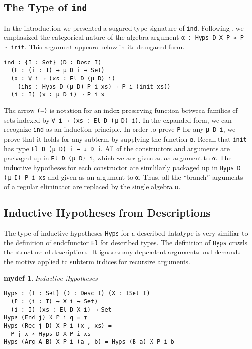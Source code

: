 \documentclass[preprint,nonatbib]{sigplanconf}
\newtheorem{mydef}{mydef}
\begin{document}
\subsection{The Type of {\tt ind}}

In the introduction we presented a sugared type signature of
{\tt ind}. Following \citet{dagand:phd}, we emphasized
the categorical nature of the algebra argument
{\tt α : Hyps D X P ⇒ P ∘ init}. 
This argument appears below in its desugared form.

\begin{verbatim}
ind : {I : Set} (D : Desc I)
  (P : (i : I) → μ D i → Set)
  (α : ∀ i → (xs : El D (μ D) i)
    (ihs : Hyps D (μ D) P i xs) → P i (init xs))
  (i : I) (x : μ D i) → P i x
\end{verbatim}

The arrow {\tt (⇒)} is notation for an index-preserving function
between families of sets indexed by
{\tt ∀ i → (xs : El D (μ D) i)}.
In the expanded form, we can recognize {\tt ind} as an induction
principle. In order to prove {\tt P} for any {\tt μ D i},
we prove that it holds for any subterm by supplying the function
{\tt α}.
Recall that {\tt init} has type {\tt El D (μ D) i → μ D i}.
All of the constructors and arguments are packaged up in
{\tt El D (μ D) i}, which we are given as an argument to
{\tt α}. The inductive hypotheses for each constructor are simililarly
packaged up in {\tt Hyps D (μ D) P i xs} and given as an argument to 
{\tt α}. Thus, all the ``branch'' arguments of a regular eliminator
are replaced by the single algebra {\tt α}.

\subsection{Inductive Hypotheses from Descriptions}

The type of inductive hypotheses {\tt Hyps} for a described datatype
is very similiar to the definition of endofunctor {\tt El} for
described types. The definition of {\tt Hyps} crawls the structure of
descriptions. It ignores any dependent arguments and demands the
motive applied to subterm indices for recursive arguments.

\begin{mydef}\label{def:hyps}
Inductive Hypotheses

\begin{verbatim}
Hyps : {I : Set} (D : Desc I) (X : ISet I)
  (P : (i : I) → X i → Set)
  (i : I) (xs : El D X i) → Set
Hyps (End j) X P i q = ⊤
Hyps (Rec j D) X P i (x , xs) =
  P j x × Hyps D X P i xs
Hyps (Arg A B) X P i (a , b) = Hyps (B a) X P i b
\end{verbatim}

\end{mydef}
\end{document}
